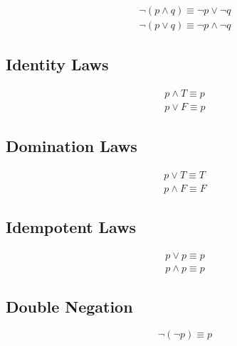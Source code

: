 \documentclass[12pt]{article}
\begin{document}
\begin{subequations}\label{deMorgan}
\begin{align}
\neg (p \wedge q) \equiv \neg p \lor \neg q\label{de_first}\\
\neg (p \lor q) \equiv \neg p \wedge \neg q\label{de_second}
\end{align}
\end{subequations}

\subsection{Identity Laws}

\begin{subequations}\label{identity}
\begin{align}
p \wedge T \equiv p\label{id_first}\\
p \lor F \equiv p\label{id_second}
\end{align}
\end{subequations}

\subsection{Domination Laws}

\begin{subequations}\label{domination}
\begin{align}
p \lor T \equiv T\label{dom_first}\\
p \wedge F \equiv F\label{dom_second}
\end{align}
\end{subequations}

\subsection{Idempotent Laws}

\begin{subequations}\label{indempotent}
\begin{align}
p \lor p \equiv p\label{indem_first}\\
p \wedge p \equiv p\label{idem_second}
\end{align}
\end{subequations}

\subsection{Double Negation}

\begin{equation}
\neg (\neg p) \equiv p
\end{equation}
\end{document}
